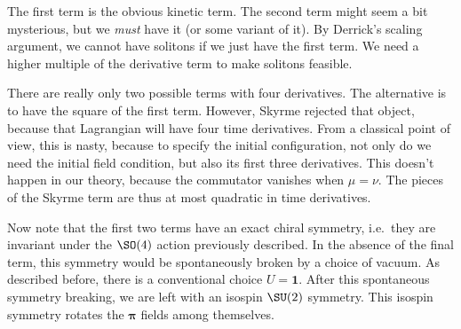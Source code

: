 \documentclass[a4paper]{article}
\begin{document}
The first term is the obvious kinetic term. The second term might seem a bit mysterious, but we \emph{must} have it (or some variant of it). By Derrick's scaling argument, we cannot have solitons if we just have the first term. We need a higher multiple of the derivative term to make solitons feasible.

There are really only two possible terms with four derivatives. The alternative is to have the square of the first term. However, Skyrme rejected that object, because that Lagrangian will have four time derivatives. From a classical point of view, this is nasty, because to specify the initial configuration, not only do we need the initial field condition, but also its first three derivatives. This doesn't happen in our theory, because the commutator vanishes when $\mu = \nu$. The pieces of the Skyrme term are thus at most quadratic in time derivatives.

Now note that the first two terms have an exact chiral symmetry, i.e.\ they are invariant under the $\SO(4)$ action previously described. In the absence of the final term, this symmetry would be spontaneously broken by a choice of vacuum. As described before, there is a conventional choice $U = \mathbf{1}$. After this spontaneous symmetry breaking, we are left with an isospin $\SU(2)$ symmetry. This isospin symmetry rotates the $\boldsymbol\pi$ fields among themselves.
\end{document}
